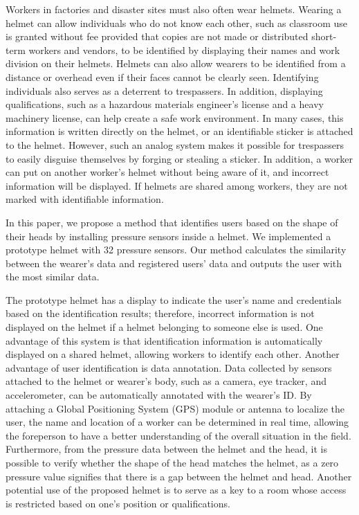 \documentclass[english,preprint,JIP]{ipsj}
\begin{document}
Workers in factories and disaster sites must also often wear helmets. Wearing a helmet can allow individuals who do not know each other, such as classroom use is granted without fee provided that copies are not made or distributed short-term workers and vendors, to be identified by displaying their names and work division on their helmets. Helmets can also allow wearers to be identified from a distance or overhead even if their faces cannot be clearly seen. Identifying individuals also serves as a deterrent to trespassers. In addition, displaying qualifications, such as a hazardous materials engineer's license and a heavy machinery license, can help create a safe work environment. In many cases, this information is written directly on the helmet, or an identifiable sticker is attached to the helmet. However, such an analog system makes it possible for trespassers to easily disguise themselves by forging or stealing a sticker. In addition, a worker can put on another worker's helmet without being aware of it, and incorrect information will be displayed. If helmets are shared among workers, they are not marked with identifiable information.\par

In this paper, we propose a method that identifies users based on the shape of their heads by installing pressure sensors inside a helmet. We implemented a prototype helmet with 32 pressure sensors. Our method calculates the similarity between the wearer's data and registered users' data and outputs the user with the most similar data.\par

The prototype helmet has a display to indicate the user's name and credentials based on the identification results; therefore, incorrect information is not displayed on the helmet if a helmet belonging to someone else is used. One advantage of this system is that identification information is automatically displayed on a shared helmet, allowing workers to identify each other. Another advantage of user identification is data annotation. Data collected by sensors attached to the helmet or wearer's body, such as a camera, eye tracker, and accelerometer, can be automatically annotated with the wearer's ID. By attaching a Global Positioning System (GPS) module or antenna to localize the user\cite{disaster_en}, the name and location of a worker can be determined in real time, allowing the foreperson to have a better understanding of the overall situation in the field. Furthermore, from the pressure data between the helmet and the head, it is possible to verify whether the shape of the head matches the helmet, as a zero pressure value signifies that there is a gap between the helmet and head. Another potential use of the proposed helmet is to serve as a key to a room whose access is restricted based on one's position or qualifications.\par
\end{document}
